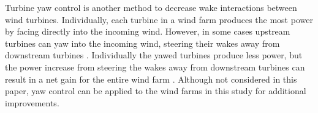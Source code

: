 \documentclass[wes, manuscript]{copernicus}
\begin{document}

Turbine yaw control is another method to decrease wake interactions between wind turbines. Individually, each turbine in a wind farm produces the most power by facing directly into the incoming wind. However, in some cases upstream turbines can yaw into the incoming wind, steering their wakes away from downstream turbines \citep{jimenez2010application,fleming2016detailed}. Individually the yawed turbines produce less power, but the power increase from steering the wakes away from downstream turbines can result in a net gain for the entire wind farm \citep{gebraad2017maximization,Fleming2016}. Although not considered in this paper, yaw control can be applied to the wind farms in this study for additional improvements.

\end{document}
